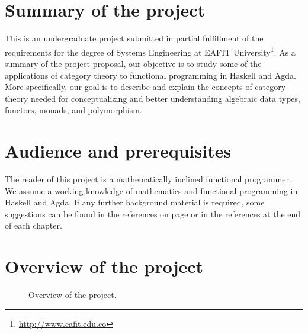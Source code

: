 \section*{Summary of the project}
\label{sec:introduction-summary}

This is an undergraduate project submitted in partial fulfillment of
the requirements for the degree of Systems Engineering at EAFIT
University\footnote{\url{http://www.eafit.edu.co}}. As a summary of
the project proposal, our objective is to study some of the
applications of category theory to functional programming in Haskell
and Agda. More specifically, our goal is to describe and explain the
concepts of category theory needed for conceptualizing and better
understanding algebraic data types, functors, monads, and
polymorphism.

\section*{Audience and prerequisites}
\label{sec:introduction-prerequisites}

The reader of this project is a mathematically inclined functional
programmer. We assume a working knowledge of mathematics and
functional programming in Haskell and Agda. If any further background
material is required, some suggestions can be found in the references
on page \pageref{sec:introduction-references} or in the references at
the end of each chapter.

\section*{Overview of the project}
\label{sec:introduction-overview}

\begin{figure}[htb]
  \begin{center}
  \end{center}
  \caption{Overview of the project.}
  \label{fig:overview}
\end{figure}

